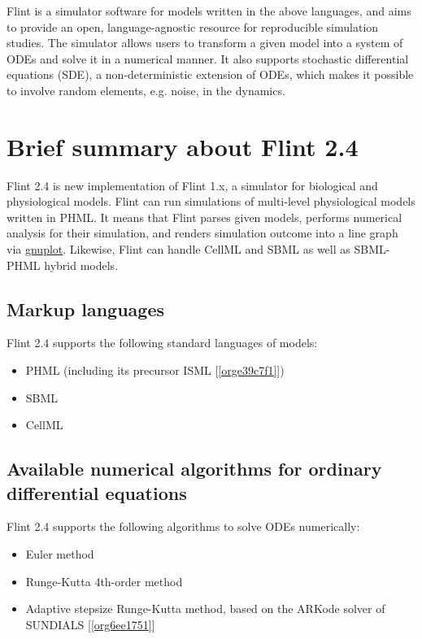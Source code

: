 \documentclass[a4paper,10pt]{report}
\begin{document}
Flint is a simulator software for models written in the above languages, and
aims to provide an open, language-agnostic resource for reproducible simulation
studies. The simulator allows users to transform a given model into a system of
ODEs and solve it in a numerical manner. It also supports stochastic
differential equations (SDE), a non-deterministic extension of ODEs, which makes
it possible to involve random elements, e.g. noise, in the dynamics.

\section{Brief summary about Flint 2.4}
\label{sec:org0215c25}
Flint 2.4 is new implementation of Flint 1.x, a simulator for biological and physiological models.
Flint can run simulations of multi-level physiological models written in PHML.
It means that Flint parses given models, performs numerical analysis for their
simulation, and renders simulation outcome into a line graph via \href{http://www.gnuplot.info/}{gnuplot}.
Likewise, Flint can handle CellML and SBML as well as SBML-PHML hybrid models.

\subsection{Markup languages}
\label{sec:org9a25cdb}
Flint 2.4 supports the following standard languages of models:

\begin{itemize}
\item PHML (including its precursor ISML [\ref{orge39c7f1}])
\item SBML
\item CellML
\end{itemize}

\subsection{Available numerical algorithms for ordinary differential equations}
\label{sec:org4764fc0}
Flint 2.4 supports the following algorithms to solve ODEs numerically:

\begin{itemize}
\item Euler method
\item Runge-Kutta 4th-order method
\item Adaptive stepsize Runge-Kutta method, based on the ARKode solver of
SUNDIALS [\ref{org6ee1751}]
\end{itemize}
\end{document}
